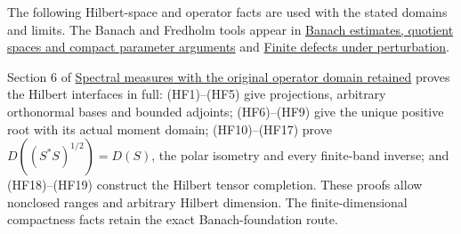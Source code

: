 \documentclass[
  11pt,
]{article}
\begin{document}
The following Hilbert-space and operator facts are used with the stated
domains and limits. The Banach and Fredholm tools appear in
\href{banach-foundation-bridges.pdf}{Banach estimates, quotient spaces
and compact parameter arguments} and \href{fredholm-stability.pdf}{Finite
defects under perturbation}.

Section 6 of \href{lower-bounded-spectral-calculus.pdf}{Spectral measures
with the original operator domain retained} proves the Hilbert
interfaces in full: (HF1)--(HF5) give projections, arbitrary orthonormal
bases and bounded adjoints; (HF6)--(HF9) give the unique positive root
with its actual moment domain; (HF10)--(HF17) prove
\(D((S^*S)^{1/2})=D(S)\), the polar isometry and every finite-band
inverse; and (HF18)--(HF19) construct the Hilbert tensor completion.
These proofs allow nonclosed ranges and arbitrary Hilbert dimension. The
finite-dimensional compactness facts retain the exact Banach-foundation
route.
\end{document}
